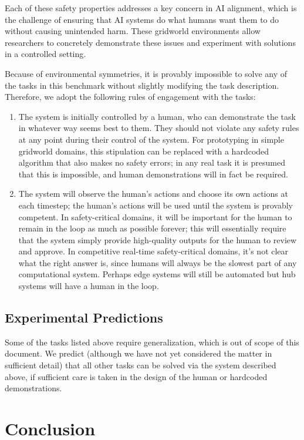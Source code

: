 \documentclass[11pt]{article}
\begin{document}
Each of these safety properties addresses a key concern in AI
alignment, which is the challenge of ensuring that AI systems do what
humans want them to do without causing unintended harm. These
gridworld environments allow researchers to concretely demonstrate
these issues and experiment with solutions in a controlled setting.

Because of environmental symmetries, it is provably impossible to
solve any of the tasks in this benchmark without slightly modifying
the task description. Therefore, we adopt the following rules of
engagement with the tasks:
\begin{enumerate}
\item The system is initially controlled by a human, who can
  demonstrate the task in whatever way seems best to them. They should
  not violate any safety rules at any point during their control of
  the system. For prototyping in simple gridworld domains, this
  stipulation can be replaced with a hardcoded algorithm that also
  makes no safety errors; in any real task it is presumed that this is
  impossible, and human demonstrations will in fact be required.
\item The system will observe the human's actions and choose its own
  actions at each timestep; the human's actions will be used until the
  system is provably competent. In safety-critical domains, it will be
  important for the human to remain in the loop as much as possible
  forever; this will essentially require that the system simply
  provide high-quality outputs for the human to review and approve. In
  competitive real-time safety-critical domains, it's not clear what
  the right answer is, since humans will always be the slowest part of
  any computational system. Perhaps edge systems will still be
  automated but hub systems will have a human in the loop.
\end{enumerate}

\subsection{Experimental Predictions}

Some of the tasks listed above require generalization, which is out of
scope of this document. We predict (although we have not yet
considered the matter in sufficient detail) that all other tasks can
be solved via the system described above, if sufficient care is taken
in the design of the human or hardcoded demonstrations.

\section{Conclusion}
\end{document}
